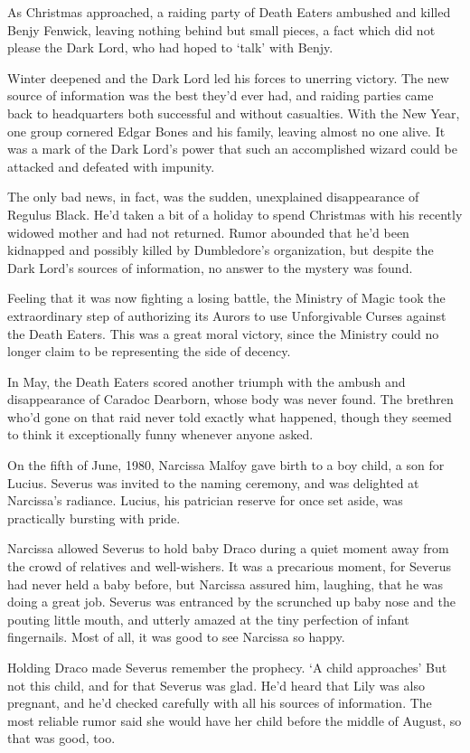 As Christmas approached, a raiding party of Death Eaters ambushed and killed Benjy Fenwick, leaving nothing behind but small pieces, a fact which did not please the Dark Lord, who had hoped to `talk' with Benjy.

Winter deepened and the Dark Lord led his forces to unerring victory. The new source of information was the best they'd ever had, and raiding parties came back to headquarters both successful and without casualties. With the New Year, one group cornered Edgar Bones and his family, leaving almost no one alive. It was a mark of the Dark Lord's power that such an accomplished wizard could be attacked and defeated with impunity.

The only bad news, in fact, was the sudden, unexplained disappearance of Regulus Black. He'd taken a bit of a holiday to spend Christmas with his recently widowed mother and had not returned. Rumor abounded that he'd been kidnapped and possibly killed by Dumbledore's organization, but despite the Dark Lord's sources of information, no answer to the mystery was found.

Feeling that it was now fighting a losing battle, the Ministry of Magic took the extraordinary step of authorizing its Aurors to use Unforgivable Curses against the Death Eaters. This was a great moral victory, since the Ministry could no longer claim to be representing the side of decency.

In May, the Death Eaters scored another triumph with the ambush and disappearance of Caradoc Dearborn, whose body was never found. The brethren who'd gone on that raid never told exactly what happened, though they seemed to think it exceptionally funny whenever anyone asked.

On the fifth of June, 1980, Narcissa Malfoy gave birth to a boy child, a son for Lucius. Severus was invited to the naming ceremony, and was delighted at Narcissa's radiance. Lucius, his patrician reserve for once set aside, was practically bursting with pride.

Narcissa allowed Severus to hold baby Draco during a quiet moment away from the crowd of relatives and well-wishers. It was a precarious moment, for Severus had never held a baby before, but Narcissa assured him, laughing, that he was doing a great job. Severus was entranced by the scrunched up baby nose and the pouting little mouth, and utterly amazed at the tiny perfection of infant fingernails. Most of all, it was good to see Narcissa so happy.

Holding Draco made Severus remember the prophecy. `A child approaches{\el}' But not this child, and for that Severus was glad. He'd heard that Lily was also pregnant, and he'd checked carefully with all his sources of information. The most reliable rumor said she would have her child before the middle of August, so that was good, too.

